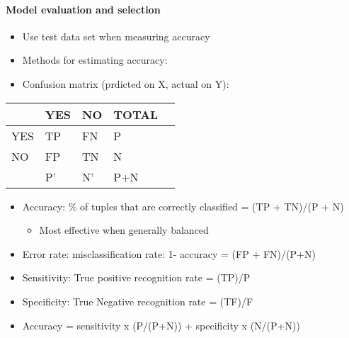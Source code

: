 \documentclass[11pt]{article}
\providecommand{\tightlist}{%
      \setlength{\itemsep}{0pt}\setlength{\parskip}{0pt}}
\begin{document}
    \paragraph{Model evaluation and
selection}\label{model-evaluation-and-selection}

    \begin{itemize}
\tightlist
\item
  Use test data set when measuring accuracy
\item
  Methods for estimating accuracy:
\end{itemize}

    \begin{itemize}
\tightlist
\item
  Confusion matrix (prdicted on X, actual on Y):
\end{itemize}

\begin{longtable}[]{@{}lllll@{}}
\toprule
& YES & NO & TOTAL &\tabularnewline
\midrule
\endhead
YES & TP & FN & P &\tabularnewline
NO & FP & TN & N &\tabularnewline
& P' & N' & P+N &\tabularnewline
\bottomrule
\end{longtable}

    \begin{itemize}
\tightlist
\item
  Accuracy: \% of tuples that are correctly classified = (TP + TN)/(P +
  N)

  \begin{itemize}
  \tightlist
  \item
    Most effective when generally balanced
  \end{itemize}
\end{itemize}

    \begin{itemize}
\tightlist
\item
  Error rate: misclassification rate: 1- accuracy = (FP + FN)/(P+N)
\end{itemize}

    \begin{itemize}
\tightlist
\item
  Sensitivity: True positive recognition rate = (TP)/P
\item
  Specificity: True Negative recognition rate = (TF)/F
\item
  Accuracy = sensitivity x (P/(P+N)) + specificity x (N/(P+N))
\end{itemize}
\end{document}
